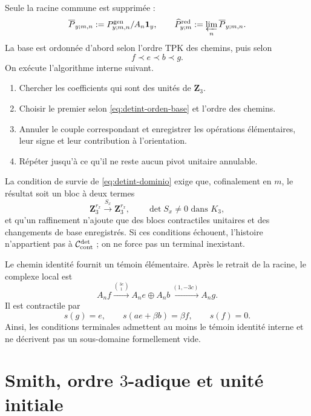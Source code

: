 Seule la racine commune est supprimée :
\begin{equation}\label{eq:detint-p-reducido}
 \overline P_{y;m,n}
 :=P^{\rm gen}_{y;m,n}/A_n\mathbf1_y,
 \qquad
 \widehat P_{y;m}^{\rm red}:=\varprojlim_n\overline P_{y;m,n}.
\end{equation}
La base est ordonnée d'abord selon l'ordre TPK des chemins, puis selon
\begin{equation}\label{eq:detint-orden-base}
 f\prec e\prec b\prec g.
\end{equation}
On exécute l'algorithme interne suivant.
\begin{enumerate}
 \item Chercher les coefficients qui sont des unités de \(\mathbf Z_3\).
 \item Choisir le premier selon \eqref{eq:detint-orden-base} et l'ordre des
 chemins.
 \item Annuler le couple correspondant et enregistrer les opérations
 élémentaires, leur signe et leur contribution à l'orientation.
 \item Répéter jusqu'à ce qu'il ne reste aucun pivot unitaire annulable.
\end{enumerate}
La condition de survie de \eqref{eq:detint-dominio} exige que,
cofinalement en \(m\), le résultat soit un bloc à deux termes
\begin{equation}\label{eq:detint-sx}
 \mathbf Z_3^{r_x}\xrightarrow{S_x}\mathbf Z_3^{r_x},
 \qquad
 \det S_x\ne0\text{ dans }K_3,
\end{equation}
et qu'un raffinement n'ajoute que des blocs contractiles unitaires et des changements
de base enregistrés. Si ces conditions échouent, l'histoire n'appartient pas à
\(\mathcal C_{\rm cont}^{\rm det}\) ; on ne force pas un terminal inexistant.

Le chemin identité fournit un témoin élémentaire. Après le retrait de la racine,
le complexe local est
\begin{equation}\label{eq:detint-testigo-contractil}
 A_nf\xrightarrow{\binom{3c}{1}}
 A_ne\oplus A_nb\xrightarrow{(1,-3c)}A_ng.
\end{equation}
Il est contractile par
\begin{equation}\label{eq:detint-contraccion-local}
 s(g)=e,
 \qquad
 s(ae+\beta b)=\beta f,
 \qquad
 s(f)=0.
\end{equation}
Ainsi, les conditions terminales admettent au moins le témoin identité
interne et ne décrivent pas un sous-domaine formellement vide.

\section{Smith, ordre \texorpdfstring{\(3\)}{3}-adique et unité initiale}

